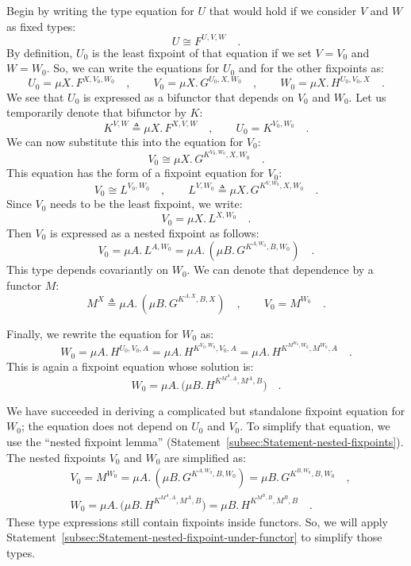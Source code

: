 Begin by writing the type equation for $U$ that would hold if we
consider $V$ and $W$ as fixed types:
\[
U\cong F^{U,V,W}\quad.
\]
By definition, $U_{0}$ is the least fixpoint of that equation if
we set $V=V_{0}$ and $W=W_{0}$. So, we can write the equations for
$U_{0}$ and for the other fixpoints as:
\[
U_{0}=\mu X.\,F^{X,V_{0},W_{0}}\quad,\quad\quad V_{0}=\mu X.\,G^{U_{0},X,W_{0}}\quad,\quad\quad W_{0}=\mu X.\,H^{U_{0},V_{0},X}\quad.
\]
We see that $U_{0}$ is expressed as a bifunctor that depends on $V_{0}$
and $W_{0}$. Let us temporarily denote that bifunctor by $K$:
\[
K^{V,W}\triangleq\mu X.\,F^{X,V,W}\quad,\quad\quad U_{0}=K^{V_{0},W_{0}}\quad.
\]
We can now substitute this into the equation for $V_{0}$:
\[
V_{0}\cong\mu X.\,G^{K^{V_{0},W_{0}},X,W_{0}}\quad.
\]
This equation has the form of a fixpoint equation for $V_{0}$:
\[
V_{0}\cong L^{V_{0},W_{0}}\quad,\quad\quad L^{V,W_{0}}\triangleq\mu X.\,G^{K^{V,W_{0}},X,W_{0}}\quad.
\]
Since $V_{0}$ needs to be the least fixpoint, we write:
\[
V_{0}=\mu X.\,L^{X,W_{0}}\quad.
\]
Then $V_{0}$ is expressed as a nested fixpoint as follows:
\[
V_{0}=\mu A.\,L^{A,W_{0}}=\mu A.\,(\mu B.\,G^{K^{A,W_{0}},B,W_{0}})\quad.
\]
This type depends covariantly on $W_{0}$. We can denote that dependence
by a functor $M$:
\[
M^{X}\triangleq\mu A.\,(\mu B.\,G^{K^{A,X},B,X})\quad,\quad\quad V_{0}=M^{W_{0}}\quad.
\]

Finally, we rewrite the equation for $W_{0}$ as:
\[
W_{0}=\mu A.\,H^{U_{0},V_{0},A}=\mu A.\,H^{K^{V_{0},W_{0}},V_{0},A}=\mu A.\,H^{K^{M^{W_{0}},W_{0}},M^{W_{0}},A}\quad.
\]
This is again a fixpoint equation whose solution is:
\[
W_{0}=\mu A.\,\big(\mu B.\,H^{K^{M^{A},A},M^{A},B}\big)\quad.
\]

We have succeeded in deriving a complicated but standalone fixpoint
equation for $W_{0}$; the equation does not depend on $U_{0}$ and
$V_{0}$. To simplify that equation, we use the \textsf{``}nested fixpoint
lemma\textsf{''} (Statement~\ref{subsec:Statement-nested-fixpoints}). The
nested fixpoints $V_{0}$ and $W_{0}$ are simplified as:
\begin{align*}
 & V_{0}=M^{W_{0}}=\mu A.\,(\mu B.\,G^{K^{A,W_{0}},B,W_{0}})=\mu B.\,G^{K^{B,W_{0}},B,W_{0}}\quad,\\
 & W_{0}=\mu A.\,\big(\mu B.\,H^{K^{M^{A},A},M^{A},B}\big)=\mu B.\,H^{K^{M^{B},B},M^{B},B}\quad.
\end{align*}
These type expressions still contain fixpoints inside functors. So,
we will apply Statement~\ref{subsec:Statement-nested-fixpoint-under-functor}
to simplify those types.

